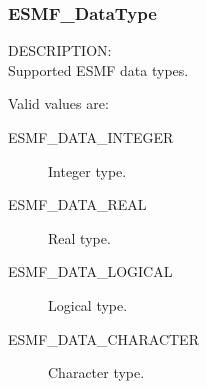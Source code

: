 \subsubsection{ESMF\_DataType}

{\sf DESCRIPTION:\\}
Supported ESMF data types.

Valid values are:
\begin{description}
\item [ESMF\_DATA\_INTEGER]
      Integer type.
\item [ESMF\_DATA\_REAL]
      Real type.
\item [ESMF\_DATA\_LOGICAL]
      Logical type.
\item [ESMF\_DATA\_CHARACTER]
      Character type.
\end{description}









